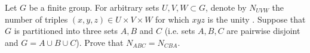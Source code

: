 Let \( G\) be a finite group. For arbitrary sets \( U, V, W \subset G\), denote by \( N_{UVW}\) the number of triples \( (x, y, z) \in U \times V \times W\) for which \( xyz\) is the unity .
Suppose that \( G\) is partitioned into three sets \( A, B\) and \( C\) (i.e. sets \( A, B, C\) are pairwise disjoint and \( G = A \cup B \cup C\)). Prove that \( N_{ABC}= N_{CBA}.\)